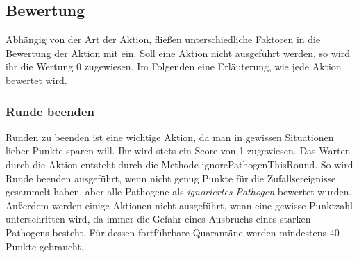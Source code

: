 \documentclass{article}
\newcommand{\gquote}[1]{\glqq #1\grqq} %
\let\oldgls\gls
\renewcommand{\gls}[1]{\emph{\oldgls{#1}}} %
\begin{document}
\subsection{Bewertung}
\label{sec:Bewertung}
Abhängig von der Art der Aktion, fließen unterschiedliche Faktoren in die Bewertung der Aktion mit ein. Soll eine Aktion nicht ausgeführt werden, so wird ihr die Wertung 0 zugewiesen. Im Folgenden eine Erläuterung, wie jede Aktion bewertet wird.
\subsubsection{Runde beenden}
Runden zu beenden ist eine wichtige Aktion, da man in gewissen Situationen lieber Punkte sparen will.
Ihr wird stets ein Score von 1 zugewiesen. Das \gquote{Warten} durch die Aktion entsteht durch die Methode \gquote{ignorePathogenThisRound}. So wird \gquote{Runde beenden} ausgeführt, wenn nicht genug Punkte für die Zufallsereignisse gesammelt haben, aber alle Pathogene als \gls{ignoriertes Pathogen} bewertet wurden. Außerdem werden einige Aktionen nicht ausgeführt, wenn eine gewisse Punktzahl unterschritten wird, da immer die Gefahr eines Ausbruchs eines starken Pathogens besteht. Für dessen fortführbare Quarantäne werden mindestens 40 Punkte gebraucht.
\end{document}
